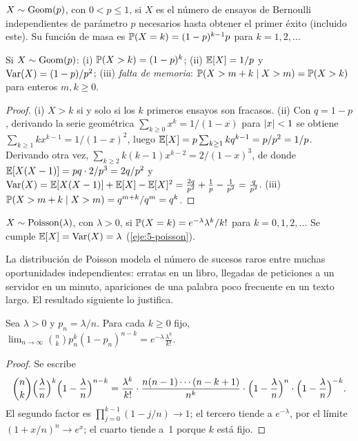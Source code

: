 \begin{definicion}[Geométrica]
$X\sim\operatorname{Geom}(p)$, con $0<p\le1$, si $X$ es el número de ensayos de Bernoulli independientes de parámetro $p$ necesarios hasta obtener el primer éxito (incluido este). Su función de masa es $\mathbb{P}(X=k)=(1-p)^{k-1}p$ para $k=1,2,\dots$
\end{definicion}

\begin{proposicion}\label{prop:t5-geom}
Si $X\sim\operatorname{Geom}(p)$: (i) $\mathbb{P}(X>k)=(1-p)^{k}$; (ii) $\mathbb{E}[X]=1/p$ y $\operatorname{Var}(X)=(1-p)/p^{2}$; (iii) \emph{falta de memoria}: $\mathbb{P}(X>m+k\mid X>m)=\mathbb{P}(X>k)$ para enteros $m,k\ge0$.
\end{proposicion}

\begin{proof}
(i) $X>k$ si y solo si los $k$ primeros ensayos son fracasos. (ii) Con $q=1-p$, derivando la serie geométrica $\sum_{k\ge0}x^{k}=1/(1-x)$ para $\lvert x\rvert<1$ se obtiene $\sum_{k\ge1}kx^{k-1}=1/(1-x)^{2}$, luego $\mathbb{E}[X]=p\sum_{k\ge1}kq^{k-1}=p/p^{2}=1/p$. Derivando otra vez, $\sum_{k\ge2}k(k-1)x^{k-2}=2/(1-x)^{3}$, de donde $\mathbb{E}[X(X-1)]=pq\cdot2/p^{3}=2q/p^{2}$ y $\operatorname{Var}(X)=\mathbb{E}[X(X-1)]+\mathbb{E}[X]-\mathbb{E}[X]^{2}=\frac{2q}{p^{2}}+\frac1p-\frac1{p^{2}}=\frac{q}{p^{2}}$. (iii) $\mathbb{P}(X>m+k\mid X>m)=q^{m+k}/q^{m}=q^{k}$.
\end{proof}

\begin{definicion}[Poisson]
$X\sim\operatorname{Poisson}(\lambda)$, con $\lambda>0$, si $\mathbb{P}(X=k)=e^{-\lambda}\lambda^{k}/k!$ para $k=0,1,2,\dots$ Se cumple $\mathbb{E}[X]=\operatorname{Var}(X)=\lambda$ (\cref{eje:5-poisson}).
\end{definicion}

La distribución de Poisson modela el número de sucesos raros entre muchas oportunidades independientes: erratas en un libro, llegadas de peticiones a un servidor en un minuto, apariciones de una palabra poco frecuente en un texto largo. El resultado siguiente lo justifica.

\begin{teorema}\label{teo:t5-poisson}
Sea $\lambda>0$ y $p_n=\lambda/n$. Para cada $k\ge0$ fijo,
\(
\lim_{n\to\infty}\binom nk p_n^{k}(1-p_n)^{n-k}=e^{-\lambda}\frac{\lambda^{k}}{k!}.
\)
\end{teorema}

\begin{proof}
Se escribe
\[
\binom nk\Bigl(\frac\lambda n\Bigr)^{k}\Bigl(1-\frac\lambda n\Bigr)^{n-k}=\frac{\lambda^{k}}{k!}\cdot\frac{n(n-1)\cdots(n-k+1)}{n^{k}}\cdot\Bigl(1-\frac\lambda n\Bigr)^{n}\cdot\Bigl(1-\frac\lambda n\Bigr)^{-k}.
\]
El segundo factor es $\prod_{j=0}^{k-1}(1-j/n)\to1$; el tercero tiende a $e^{-\lambda}$, por el límite $(1+x/n)^{n}\to e^{x}$; el cuarto tiende a~1 porque $k$ está fijo.
\end{proof}

